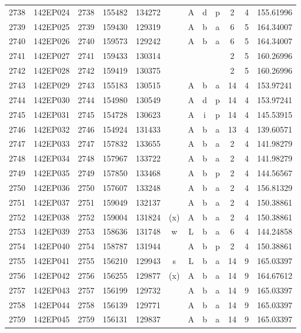 \begin{tabular}{|*{12}{c|}}
2738 & 142EP024 & 2738 & 155482 & 134272 &  & A & d & p & 2 & 4 & 155.61996 \\ 
2739 & 142EP025 & 2739 & 159430 & 129319 &  & A & b & a & 6 & 5 & 164.34007 \\ 
2740 & 142EP026 & 2740 & 159573 & 129242 &  & A & b & a & 6 & 5 & 164.34007 \\ 
2741 & 142EP027 & 2741 & 159433 & 130314 &  &  &  &  & 2 & 5 & 160.26996 \\ 
2742 & 142EP028 & 2742 & 159419 & 130375 &  &  &  &  & 2 & 5 & 160.26996 \\ 
2743 & 142EP029 & 2743 & 155183 & 130515 &  & A & b & a & 14 & 4 & 153.97241 \\ 
2744 & 142EP030 & 2744 & 154980 & 130549 &  & A & d & p & 14 & 4 & 153.97241 \\ 
2745 & 142EP031 & 2745 & 154728 & 130623 &  & A & i & p & 14 & 4 & 145.53915 \\ 
2746 & 142EP032 & 2746 & 154924 & 131433 &  & A & b & a & 13 & 4 & 139.60571 \\ 
2747 & 142EP033 & 2747 & 157832 & 133655 &  & A & b & a & 2 & 4 & 141.98279 \\ 
2748 & 142EP034 & 2748 & 157967 & 133722 &  & A & b & a & 2 & 4 & 141.98279 \\ 
2749 & 142EP035 & 2749 & 157850 & 133468 &  & A & b & p & 2 & 4 & 144.56567 \\ 
2750 & 142EP036 & 2750 & 157607 & 133248 &  & A & b & a & 2 & 4 & 156.81329 \\ 
2751 & 142EP037 & 2751 & 159049 & 132137 &  & A & b & a & 2 & 4 & 150.38861 \\ 
2752 & 142EP038 & 2752 & 159004 & 131824 & (x) & A & b & a & 2 & 4 & 150.38861 \\ 
2753 & 142EP039 & 2753 & 158636 & 131748 & w & L & b & a & 6 & 4 & 144.24858 \\ 
2754 & 142EP040 & 2754 & 158787 & 131944 &  & A & b & p & 2 & 4 & 150.38861 \\ 
2755 & 142EP041 & 2755 & 156210 & 129943 & s & L & b & a & 14 & 9 & 165.03397 \\ 
2756 & 142EP042 & 2756 & 156255 & 129877 & (x) & A & b & a & 14 & 9 & 164.67612 \\ 
2757 & 142EP043 & 2757 & 156199 & 129732 &  & A & b & a & 14 & 9 & 165.03397 \\ 
2758 & 142EP044 & 2758 & 156139 & 129771 &  & A & b & a & 14 & 9 & 165.03397 \\ 
2759 & 142EP045 & 2759 & 156131 & 129837 &  & A & b & a & 14 & 9 & 165.03397 \\ 

\end{tabular}
